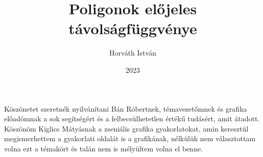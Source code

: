 \documentclass[
]{thesis}[2022/04/30]
\title{Poligonok előjeles távolságfüggvénye} %
\date{2023} %
\author{Horváth István}
\affiliation{MSc, doktorandusz} %
\begin{document}


\maketitle
%

\tableofcontents
\cleardoublepage


\cleardoublepage


\cleardoublepage


\cleardoublepage


\cleardoublepage

\chapter*{\acklabel}
Köszönetet szeretnék nyilvánítani Bán Róbertnek, témavezetőmnek és grafika előadómnak a sok segítségért és a felbecsülhetetlen értékű tudásért, amit átadott. Köszönöm Kiglics Mátyásnak a zseniális grafika gyakorlatokat, amin keresztül megismerhettem a gyakorlati oldalát is a grafikának, nélkülük nem választottam volna ezt a témakört és talán nem is mélyültem volna el benne.

{}
\printbibliography[title=\biblabel]
\cleardoublepage

{}
\listoffigures
\cleardoublepage

{}
\lstlistoflistings
\cleardoublepage

\end{document}

